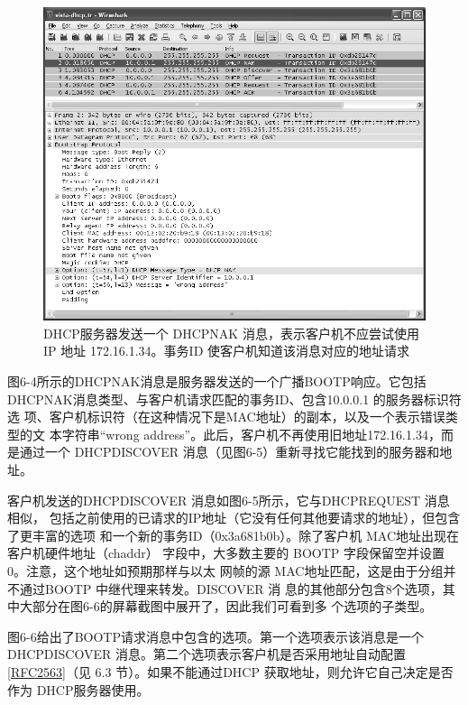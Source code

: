 \begin{figure}[H]
  \centering
  \includegraphics[scale=0.5]{imgs/6/6-4.png}
  \caption{DHCP服务器发送一个 DHCPNAK 消息，表示客户机不应尝试使用 IP 地址 172.16.1.34。事务ID
  使客户机知道该消息对应的地址请求}
\end{figure}

图6-4所示的DHCPNAK消息是服务器发送的一个广播BOOTP响应。它包括
DHCPNAK消息类型、与客户机请求匹配的事务ID、包含10.0.0.1 的服务器标识符选
项、客户机标识符（在这种情况下是MAC地址）的副本，以及一个表示错误类型的文
本字符串“wrong address”。此后，客户机不再使用旧地址172.16.1.34，而是通过一个
DHCPDISCOVER 消息（见图6-5）重新寻找它能找到的服务器和地址。

客户机发送的DHCPDISCOVER 消息如图6-5所示，它与DHCPREQUEST 消息相似，
包括之前使用的已请求的IP地址（它没有任何其他要请求的地址），但包含了更丰富的选项
和一个新的事务ID（0x3a681b0b）。除了客户机 MAC地址出现在客户机硬件地址（chaddr）
字段中，大多数主要的 BOOTP 字段保留空并设置0。注意，这个地址如预期那样与以太
网帧的源 MAC地址匹配，这是由于分组并不通过BOOTP 中继代理来转发。DISCOVER 消
息的其他部分包含8个选项，其中大部分在图6-6的屏幕截图中展开了，因此我们可看到多
个选项的子类型。

图6-6给出了BOOTP请求消息中包含的选项。第一个选项表示该消息是一个
DHCPDISCOVER
消息。第二个选项表示客户机是否采用地址自动配置\href{https://www.rfc-editor.org/rfc/rfc2563}{\href{https://www.rfc-editor.org/rfc/rfc2563}{[RFC2563]}}（见
6.3
节）。如果不能通过DHCP 获取地址，则允许它自己决定是否作为 DHCP服务器使用。

